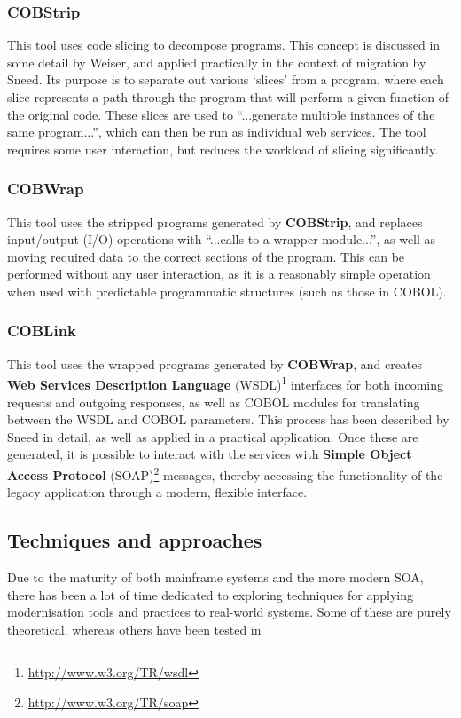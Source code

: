 \documentclass[12pt,journal,compsoc]{IEEEtran}
\begin{document}
\subsubsection{COBStrip}
\label{subsubsec:cobstrip}
This tool uses code slicing to decompose programs\cite{Canfora2000}. This concept is discussed in some detail by Weiser\cite{Weiser1984}, and applied practically in the context of migration by Sneed\cite{Sneed2009,Sneed2008}. Its purpose is to separate out various `slices' from a program, where each slice represents a path through the program that will perform a given function of the original code. These slices are used to ``...generate multiple instances of the same program...''\cite{Sneed2009,Sneed2008}, which can then be run as individual web services. The tool requires some user interaction, but reduces the workload of slicing significantly.

\subsubsection{COBWrap}
\label{subsubsec:cobwrap}
This tool uses the stripped programs generated by \textbf{COBStrip}, and replaces input/output (I/O) operations with ``...calls to a wrapper module...''\cite{Sneed2009,Sneed2008}, as well as moving required data to the correct sections of the program. This can be performed without any user interaction, as it is a reasonably simple operation when used with predictable programmatic structures (such as those in COBOL).

\subsubsection{COBLink}
\label{subsubsec:coblink}
This tool uses the wrapped programs generated by \textbf{COBWrap}, and creates \textbf{Web Services Description Language} (WSDL)\footnote{\url{http://www.w3.org/TR/wsdl}} interfaces for both incoming requests and outgoing responses, as well as COBOL modules for translating between the WSDL and COBOL parameters. This process has been described by Sneed in detail\cite{Sneed2001}, as well as applied in a practical application\cite{Sneed2009,Sneed2008}. Once these are generated, it is possible to interact with the services with \textbf{Simple Object Access Protocol} (SOAP)\footnote{\url{http://www.w3.org/TR/soap}} messages, thereby accessing the functionality of the legacy application through a modern, flexible interface.

\subsection{Techniques and approaches}
\label{subsec:techniques}
Due to the maturity of both mainframe systems and the more modern SOA, there has been a lot of time dedicated to exploring techniques for applying modernisation tools and practices to real-world systems. Some of these are purely theoretical, whereas others have been tested in
\end{document}
